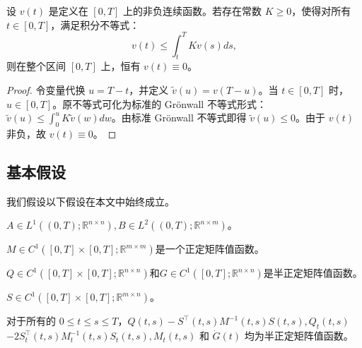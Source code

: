\documentclass{GZUbachelorthesis}
\begin{document}
\vspace{1em}
\begin{lem}\label{lem:backward_gronwall}
	设 $v(t)$ 是定义在 $[0,T]$ 上的非负连续函数。若存在常数 $K \ge 0$，使得对所有 $t \in [0,T]$，满足积分不等式：
	\begin{equation}
		v(t) \le \int_t^T K v(s) ds,
	\end{equation}
	则在整个区间 $[0,T]$ 上，恒有 $v(t) \equiv 0$。
\end{lem}
\begin{proof}
	令变量代换 $u = T - t$，并定义 $\tilde{v}(u) = v(T - u)$。当 $t \in [0,T]$ 时，$u \in [0,T]$。原不等式可化为标准的 Grönwall 不等式形式：$\tilde{v}(u) \le \int_0^u K \tilde{v}(w) dw$。由标准 Grönwall 不等式即得 $\tilde{v}(u) \le 0$。由于 $v(t)$ 非负，故 $v(t) \equiv 0$。
\end{proof}
\vspace{1em}
\subsection{基本假设}
我们假设以下假设在本文中始终成立。
\begin{list1}
	\item ${A\in L^1((0,T);\mathbb{R}^{n\times n}),B\in L^2((0,T);\mathbb{R}^{n\times m})}$。
	\item ${M\in C^1([0,T]\times[0,T];\mathbb{R}^{m\times m})}$是一个正定矩阵值函数。
	\item ${Q\in C^1([0,T]\times[0,T];\mathbb{R}^{n\times n})}$和${G\in C^1([0,T];\mathbb{R}^{n\times n})}$是半正定矩阵值函数。
	\item ${S\in C^1([0,T]\times[0,T];\mathbb{R}^{m\times n})}$。
	\item 对于所有的 ${0 \leq t \leq s \leq T}$，$Q(t, s) - S^\top(t, s)M^{-1}(t, s)S(t, s), Q_t(t, s)$ \\$- 2S_t^\top(t, s)M^{-1}_t(t, s)S_t(t, s), M_t(t, s)$ 和 ${\dot{G}(t)}$ 均为半正定矩阵值函数。
\end{list1}
\newpage
\end{document}
